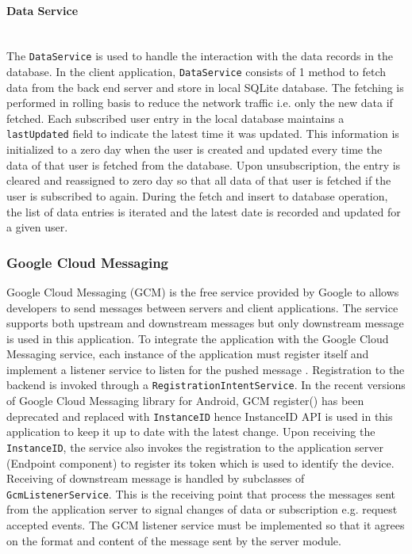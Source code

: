 \paragraph{Data Service} \mbox{} \\
The \texttt{DataService} is used to handle the interaction with the data records in the database. In the client
application, \texttt{DataService} consists of 1 method to fetch data from the back end server and store in local SQLite
database. The fetching is performed in rolling basis to reduce the network traffic i.e. only the new data if fetched.
Each subscribed user entry in the local database maintains a \texttt{lastUpdated} field to indicate the latest time it
was updated.  This information is initialized to a zero day when the user is created and updated every time the data of
that user is fetched from the database. Upon unsubscription, the entry is cleared and reassigned to zero day so that all
data of that user is fetched if the user is subscribed to again. During the fetch and insert to database operation, the
list of data entries is iterated and the latest date is recorded and updated for a given user.

\subsubsection{Google Cloud Messaging}
Google Cloud Messaging (GCM) is the free service provided by Google to allows developers to send messages between
servers and client applications. The service supports both upstream and downstream messages but only downstream message
is used in this application.
To integrate the application with the Google Cloud Messaging service, each instance of the application must register
itself and implement a listener service to listen for the pushed message \cite{CloudMessaging}. Registration to the
backend is invoked through a \texttt{RegistrationIntentService}. In the recent versions of Google Cloud Messaging
library for Android, GCM register() has been deprecated and replaced with \texttt{InstanceID} hence InstanceID API is used in
this application to keep it up to date with the latest change. Upon receiving the \texttt{InstanceID}, the service also
invokes the registration to the application server (Endpoint component) to register its token which is used to identify
the device.
Receiving of downstream message is handled by subclasses of \texttt{GcmListenerService}. This is the receiving point
that process the messages sent from the application server to signal changes of data or subscription e.g. request
accepted events. The GCM listener service must be implemented so that it agrees on the format and content of the message
sent by the server module.

